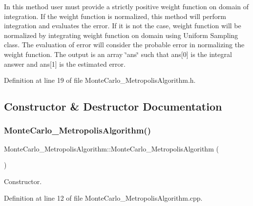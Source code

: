 In this method user must provide a strictly positive weight function on domain of integration. If the weight function is normalized, this method will perform integration and evaluates the error. If it is not the case, weight function will be normalized by integrating weight function on domain using Uniform Sampling class. The evaluation of error will consider the probable error in normalizing the weight function. The output is an array \char`\"{}ans\char`\"{} such that ans\mbox{[}0\mbox{]} is the integral answer and ans\mbox{[}1\mbox{]} is the estimated error. 

Definition at line 19 of file Monte\+Carlo\+\_\+\+Metropolis\+Algorithm.\+h.



\subsection{Constructor \& Destructor Documentation}
\mbox{\label{class_monte_carlo___metropolis_algorithm_a80995ad029b056ca675c751c247426a5}} 
\subsubsection{\texorpdfstring{Monte\+Carlo\+\_\+\+Metropolis\+Algorithm()}{MonteCarlo\_MetropolisAlgorithm()}}
{\footnotesize\ttfamily Monte\+Carlo\+\_\+\+Metropolis\+Algorithm\+::\+Monte\+Carlo\+\_\+\+Metropolis\+Algorithm (\begin{DoxyParamCaption}{ }\end{DoxyParamCaption})}



Constructor. 



Definition at line 12 of file Monte\+Carlo\+\_\+\+Metropolis\+Algorithm.\+cpp.

\mbox{\label{class_monte_carlo___metropolis_algorithm_aecedd40f8c0098bc66d455ef06814981}} 
